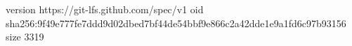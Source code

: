 version https://git-lfs.github.com/spec/v1
oid sha256:9f49e777fe7ddd9d02dbed7bf44de54bbf9e866c2a42dde1e9a1fd6c97b93156
size 3319
